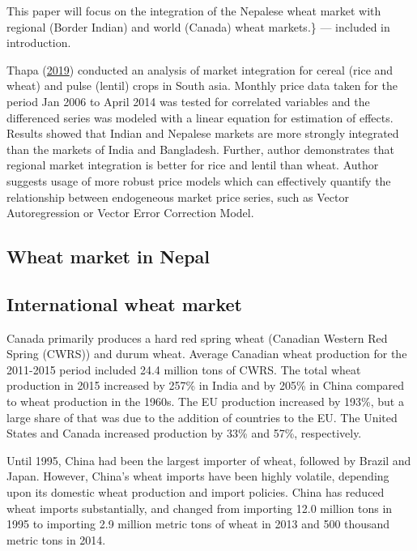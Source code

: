 \documentclass[12pt,]{article}
\begin{document}
This paper will focus on the integration of the Nepalese wheat market with regional (Border Indian) and world (Canada) wheat markets.\} --- included in introduction.

Thapa (\protect\hyperlink{ref-sridharthapaspatial2019}{2019}) conducted an analysis of market integration for cereal (rice and wheat) and pulse (lentil) crops in South asia. Monthly price data taken for the period Jan 2006 to April 2014 was tested for correlated variables and the differenced series was modeled with a linear equation for estimation of effects. Results showed that Indian and Nepalese markets are more strongly integrated than the markets of India and Bangladesh. Further, author demonstrates that regional market integration is better for rice and lentil than wheat. Author suggests usage of more robust price models which can effectively quantify the relationship between endogeneous market price series, such as Vector Autoregression or Vector Error Correction Model.

\hypertarget{wheat-market-in-nepal}{%
\subsection{Wheat market in Nepal}\label{wheat-market-in-nepal}}

\hypertarget{international-wheat-market}{%
\subsection{International wheat market}\label{international-wheat-market}}

Canada primarily produces a hard red spring wheat (Canadian Western Red Spring (CWRS)) and durum wheat. Average Canadian wheat production for the 2011-2015 period included 24.4 million tons of CWRS.
The total wheat production in 2015 increased by 257\% in India and by 205\% in China compared to wheat production in the 1960s. The EU production increased by 193\%, but a large share of that was due to the addition of countries to the EU. The United States and Canada increased production by 33\% and 57\%, respectively.

Until 1995, China had been the largest importer of wheat, followed by Brazil and Japan. However, China's wheat imports have been highly volatile, depending upon its domestic wheat production and import policies. China has reduced wheat imports substantially, and changed from importing 12.0 million tons in 1995 to importing 2.9 million metric tons of wheat in 2013 and 500 thousand metric tons in 2014.
\end{document}
